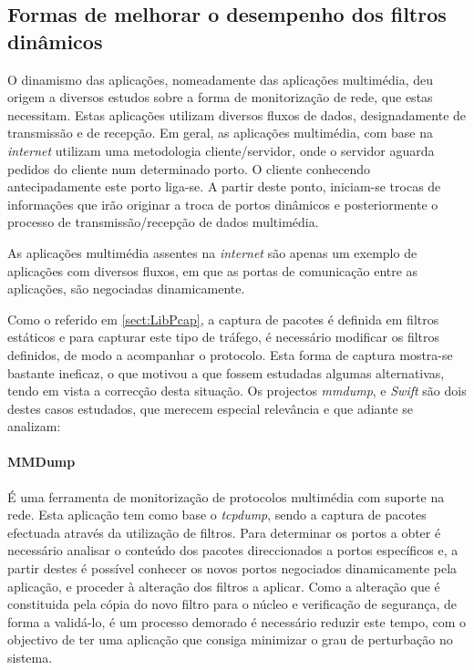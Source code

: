 

\subsection{Formas de melhorar o desempenho dos filtros dinâmicos}
 O dinamismo das aplicações, nomeadamente das aplicações multimédia, deu origem a diversos estudos sobre a forma de monitorização de rede, que estas necessitam.
Estas aplicações utilizam diversos fluxos de dados, designadamente de transmissão e de recepção.
Em geral, as aplicações multimédia, com base na \textit{internet} utilizam uma metodologia cliente/servidor, onde o servidor aguarda pedidos do cliente num determinado porto.
O cliente conhecendo antecipadamente este porto liga-se.
A partir deste ponto, iniciam-se trocas de informações que irão originar a troca de portos dinâmicos e posteriormente o processo de transmissão/recepção de dados multimédia.

As aplicações multimédia assentes na \textit{internet} são apenas um exemplo de aplicações com diversos fluxos, em que as portas de comunicação entre as aplicações, são negociadas dinamicamente.

Como o referido em \ref{sect:LibPcap}, a captura de pacotes é definida em filtros estáticos e para capturar este tipo de tráfego, é necessário modificar os filtros definidos, de modo a acompanhar o protocolo.
Esta forma de captura mostra-se bastante ineficaz, o que motivou a que fossem estudadas algumas alternativas, tendo em vista a correcção desta situação.
Os projectos \textit{mmdump}\cite{505678}, %
e \textit{Swift}\cite{1387609} são dois destes casos estudados, que merecem especial relevância e que adiante se analizam:

\paragraph*{MMDump} É uma ferramenta de monitorização de protocolos multimédia com suporte na rede.
Esta aplicação tem como base o \textit{tcpdump}, sendo a captura de pacotes efectuada através da utilização de filtros.
Para determinar os portos a obter é necessário analisar o conteúdo dos pacotes direccionados a portos específicos e, a partir destes é possível conhecer os novos portos negociados dinamicamente pela aplicação, e proceder à alteração dos filtros a aplicar.
Como a alteração que é constituida pela cópia do novo filtro para o núcleo e verificação de segurança, de forma a validá-lo, é um processo demorado é necessário reduzir este tempo, com o objectivo de ter uma aplicação que consiga minimizar o grau de perturbação no sistema.

